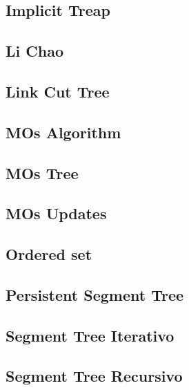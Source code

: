 \subsection{Implicit Treap}
\raggedbottom
\hrulefill
\subsection{Li Chao}
\raggedbottom
\hrulefill
\subsection{Link Cut Tree}
\raggedbottom
\hrulefill
\subsection{MOs Algorithm}
\raggedbottom
\hrulefill
\subsection{MOs Tree}
\raggedbottom
\hrulefill
\subsection{MOs Updates}
\raggedbottom
\hrulefill
\subsection{Ordered set}
\raggedbottom
\hrulefill
\subsection{Persistent Segment Tree}
\raggedbottom
\hrulefill
\subsection{Segment Tree Iterativo}
\raggedbottom
\hrulefill
\subsection{Segment Tree Recursivo}
\raggedbottom
\hrulefill
